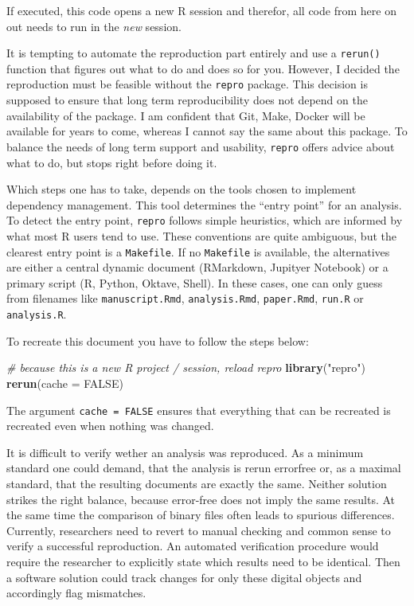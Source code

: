 \documentclass[12pt,a4paper,twoside]{article}
\newenvironment{Shaded}{\begin{snugshade}}{\end{snugshade}}
\newcommand{\CommentTok}[1]{\textcolor[rgb]{0.56,0.35,0.01}{\textit{#1}}}
\newcommand{\DataTypeTok}[1]{\textcolor[rgb]{0.13,0.29,0.53}{#1}}
\newcommand{\KeywordTok}[1]{\textcolor[rgb]{0.13,0.29,0.53}{\textbf{#1}}}
\newcommand{\NormalTok}[1]{#1}
\newcommand{\OtherTok}[1]{\textcolor[rgb]{0.56,0.35,0.01}{#1}}
\newcommand{\StringTok}[1]{\textcolor[rgb]{0.31,0.60,0.02}{#1}}
\begin{document}
If executed, this code opens a new R session and therefor, all code from here on out needs to run in the \emph{new} session.

It is tempting to automate the reproduction part entirely and use a \texttt{rerun()} function that figures out what to do and does so for you.
However, I decided the reproduction must be feasible without the \texttt{repro} package.
This decision is supposed to ensure that long term reproducibility does not depend on the availability of the package.
I am confident that Git, Make, Docker will be available for years to come, whereas I cannot say the same about this package.
To balance the needs of long term support and usability, \texttt{repro} offers advice about what to do, but stops right before doing it.

Which steps one has to take, depends on the tools chosen to implement dependency management.
This tool determines the ``entry point'' for an analysis.
To detect the entry point, \texttt{repro} follows simple heuristics, which are informed by what most R users tend to use.
These conventions are quite ambiguous, but the clearest entry point is a \texttt{Makefile}.
If no \texttt{Makefile} is available, the alternatives are either a central dynamic document (RMarkdown, Jupityer Notebook) or a primary script (R, Python, Oktave, Shell).
In these cases, one can only guess from filenames like \texttt{manuscript.Rmd}, \texttt{analysis.Rmd}, \texttt{paper.Rmd}, \texttt{run.R} or \texttt{analysis.R}.

To recreate this document you have to follow the steps below:

\begin{Shaded}
\begin{Highlighting}[]
\CommentTok{# because this is a new R project / session, reload repro}
\KeywordTok{library}\NormalTok{(}\StringTok{"repro"}\NormalTok{)}
\KeywordTok{rerun}\NormalTok{(}\DataTypeTok{cache =} \OtherTok{FALSE}\NormalTok{)}
\end{Highlighting}
\end{Shaded}

The argument \texttt{cache\ =\ FALSE} ensures that everything that can be recreated is recreated even when nothing was changed.

It is difficult to verify wether an analysis was reproduced.
As a minimum standard one could demand, that the analysis is rerun errorfree or, as a maximal standard, that the resulting documents are exactly the same.
Neither solution strikes the right balance, because error-free does not imply the same results. At the same time the comparison of binary files often leads to spurious differences.
Currently, researchers need to revert to manual checking and common sense to verify a successful reproduction.
An automated verification procedure would require the researcher to explicitly state which results need to be identical.
Then a software solution could track changes for only these digital objects and accordingly flag mismatches.
\end{document}
